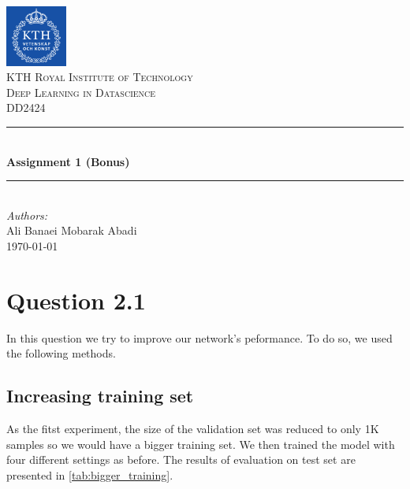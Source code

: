 \documentclass[a4paper]{article}
\begin{document}
\begin{titlepage}

\newcommand{\HRule}{\rule{\linewidth}{0.5mm}} 							%
\center 
 
 

\includegraphics[width=0.15\textwidth]{images/kth_logo.png}\\[0.5cm] 	%

\textsc{\LARGE KTH Royal Institute of Technology}\\[1cm]

\textsc{\Large Deep Learning in Datascience}\\[0.2cm]
\textsc{\large DD2424}\\[1cm] 										%
\HRule \\[0.8cm]
{ \huge \bfseries Assignment 1 (Bonus)}\\[0.7cm]								%
\HRule \\[2cm]
\large
\emph{Authors:}\\
Ali Banaei Mobarak Abadi\\[1.5cm]													%
{\large \today}\\[5cm]

\vfill 
\end{titlepage}


\section*{Question 2.1}
In this question we try to improve our network's peformance. To do so, we used the following methods.

\subsection*{Increasing training set}
As the fitst experiment, the size of the validation set was reduced to only 1K samples so we would have a bigger training set. We then trained the model with four different settings as before. The results of evaluation on test set are presented in \autoref{tab:bigger_training}.
\end{document}
